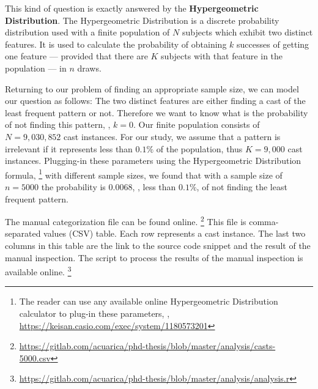 %
This kind of question is exactly answered by the \textbf{Hypergeometric Distribution}.
The Hypergeometric Distribution is a discrete probability distribution used with a finite population of $N$ subjects
%
%
which exhibit two distinct features.
It is used to calculate the probability of obtaining $k$ successes of getting one feature --- provided that there are $K$ subjects with that feature in the population --- in $n$ draws.

Returning to our problem of finding an appropriate sample size, we can model our question as follows:
The two distinct features are either finding a cast of the least frequent pattern or not.
Therefore we want to know what is the probability of not finding this pattern, \ie, $k = 0$.
Our finite population consists of $N = 9,030,852$ cast instances.
%
%
For our study, we assume that a pattern is irrelevant if it represents less than $0.1\%$ of the population, thus $K = 9,000$ cast instances.
Plugging-in these parameters using the Hypergeometric Distribution formula,%
\footnote{The reader can use any available online Hypergeometric Distribution calculator to plug-in these parameters, \eg, \url{https://keisan.casio.com/exec/system/1180573201}}
with different sample sizes,
%
%
we found that with a sample size of $n = 5000$ the probability is $0.0068$,
\ie, less than $0.1 \%$, of not finding the least frequent pattern.

%
The manual categorization file can be found online.%
\footnote{\url{https://gitlab.com/acuarica/phd-thesis/blob/master/analysis/casts-5000.csv}}
This file is comma-separated values (CSV) table.
Each row represents a cast instance.
The last two columns in this table are the link to the source code snippet and the result of the manual inspection.
The script to process the results of the manual inspection is available online.%
\footnote{\url{https://gitlab.com/acuarica/phd-thesis/blob/master/analysis/analysis.r}}



